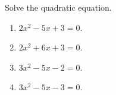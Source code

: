 Solve the quadratic equation.
\begin{enumerate}[ref={\fcProblemRef}]
\item $2x^2-5x+3=0$.

\item $2x^2+6x+3=0$.

\item $3x^2-5x-2=0$.

\item $3x^2-5x-3=0$.

\end{enumerate}